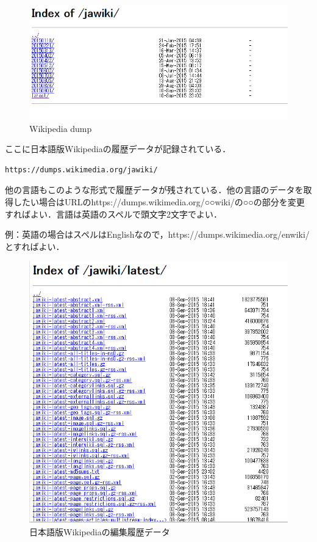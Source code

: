 \begin{figure}[htb]
\centering
\includegraphics[width=13cm]{sample4.png}
\caption{Wikipedia dump}\label{サンプル図}
\end{figure}

ここに日本語版Wikipediaの履歴データが記録されている．

{\small
\begin{verbatim}
https://dumps.wikimedia.org/jawiki/
\end{verbatim}}



他の言語もこのような形式で履歴データが残されている．他の言語のデータを取得したい場合はURLのhttps://dumps.wikimedia.org/○○wiki/の○○の部分を変更すればよい．言語は英語のスペルで頭文字2文字でよい．

例：英語の場合はスペルはEnglishなので，https://dumps.wikimedia.org/enwiki/とすればよい．



\begin{figure}[H]
\centering
\includegraphics[width=13cm]{sample5.png}
\caption{日本語版Wikipediaの編集履歴データ}\label{サンプル図}
\end{figure}

